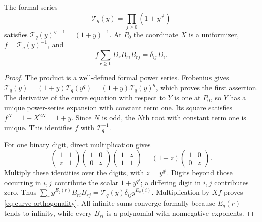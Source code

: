 \begin{lemma}\label{lem:curve-orthogonality}
The formal series
\[
 \mathcal T_q(y)=\prod_{j\geq0}(1+y^{q^j})
\]
satisfies $\mathcal T_q(y)^{q-1}=(1+y)^{-1}$. At $P_0$ the coordinate $X$ is a uniformizer, $f=\mathcal T_q(y)^{-1}$, and
\begin{equation}\label{eq:curve-orthogonality}
 f\sum_{r\geq0}D_r B_{ri}B_{rj}=\delta_{ij}D_i.
\end{equation}
\end{lemma}
\begin{proof}
The product is a well-defined formal power series. Frobenius gives
$\mathcal T_q(y)=(1+y)\mathcal T_q(y^q)=(1+y)\mathcal T_q(y)^q$,
which proves the first assertion. The derivative of the curve equation with respect to $Y$ is one at $P_0$, so $Y$ has a unique power-series expansion with constant term one. Its square satisfies
$f^N=1+X^{2N}=1+y$. Since $N$ is odd, the $N$th root with constant term one is unique. This identifies $f$ with $\mathcal T_q^{-1}$.

For one binary digit, direct multiplication gives
\[
 \begin{pmatrix}1&1\\z&1\end{pmatrix}
 \begin{pmatrix}1&0\\0&z\end{pmatrix}
 \begin{pmatrix}1&z\\1&1\end{pmatrix}
 =(1+z)\begin{pmatrix}1&0\\0&z\end{pmatrix}.
\]
Multiply these identities over the digits, with $z=y^{q^j}$. Digits beyond those occurring in $i,j$ contribute the scalar $1+y^{q^j}$; a differing digit in $i,j$ contributes zero. Thus
$\sum_r y^{E_q(r)}B_{ri}B_{rj}=\mathcal T_q(y)\delta_{ij}y^{E_q(i)}$.
Multiplication by $Xf$ proves \eqref{eq:curve-orthogonality}. All infinite sums converge formally because $E_q(r)$ tends to infinity, while every $B_{ri}$ is a polynomial with nonnegative exponents.
\end{proof}

